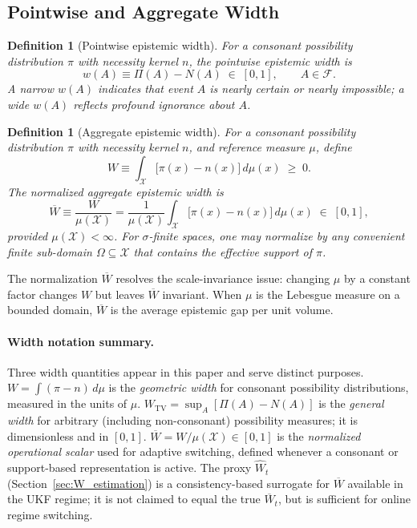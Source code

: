 \documentclass[12pt]{article}
\newtheorem{definition}[theorem]{Definition}
\newcommand{\calF}{\mathcal{F}}
\newcommand{\calX}{\mathcal{X}}
\begin{document}
\subsection{Pointwise and Aggregate Width}

\begin{definition}[Pointwise epistemic width]
For a consonant possibility distribution $\pi$ with necessity kernel $n$,
the \emph{pointwise epistemic width} is
\begin{equation}
w(A) \equiv \Pi(A) - N(A) \;\in\; [0,1], \qquad A\in\calF.
\label{eq:wA}
\end{equation}
A narrow $w(A)$ indicates that event $A$ is nearly certain or nearly impossible;
a wide $w(A)$ reflects profound ignorance about $A$.
\end{definition}

\begin{definition}[Aggregate epistemic width]
\label{def:W}
For a consonant possibility distribution $\pi$ with necessity kernel $n$,
and reference measure $\mu$, define
\begin{equation}
W \equiv \int_\calX \bigl[\pi(x)-n(x)\bigr]\,d\mu(x) \;\ge\; 0.
\label{eq:W}
\end{equation}
The normalized aggregate epistemic width is
\begin{equation}
\overline{W} \equiv \frac{W}{\mu(\calX)} = \frac{1}{\mu(\calX)}
\int_\calX \bigl[\pi(x)-n(x)\bigr]\,d\mu(x) \;\in\; [0,1],
\label{eq:Wbar}
\end{equation}
provided $\mu(\calX)<\infty$.
For $\sigma$-finite spaces, one may normalize by any convenient finite
sub-domain $\Omega\subseteq\calX$ that contains the effective support of $\pi$.
\end{definition}

The normalization $\overline{W}$ resolves the scale-invariance issue: changing
$\mu$ by a constant factor changes $W$ but leaves $\overline{W}$ invariant.
When $\mu$ is the Lebesgue measure on a bounded domain, $\overline{W}$ is the
average epistemic gap per unit volume.

\paragraph{Width notation summary.}
Three width quantities appear in this paper and serve distinct purposes.
$W = \int(\pi-n)\,d\mu$ is the \emph{geometric width} for consonant
possibility distributions, measured in the units of $\mu$.
$W_{\mathrm{TV}} = \sup_A[\Pi(A)-N(A)]$ is the \emph{general width} for arbitrary
(including non-consonant) possibility measures; it is dimensionless and in $[0,1]$.
$\overline{W} = W/\mu(\calX) \in [0,1]$ is the \emph{normalized operational scalar}
used for adaptive switching, defined whenever a consonant or support-based
representation is active.
The proxy $\widehat{W}_t$ (Section~\ref{sec:W_estimation}) is a consistency-based
surrogate for $\overline{W}$ available in the UKF regime; it is not claimed to
equal the true $\overline{W}_t$, but is sufficient for online regime switching.
\end{document}
